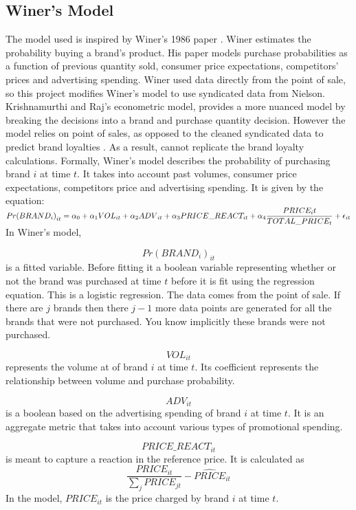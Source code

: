 \documentclass{article}
\begin{document}
\subsection{Winer's Model}

The model used is inspired by Winer's 1986 paper \cite{winer}. Winer estimates the probability buying a brand's product. His paper models purchase probabilities as a function of previous quantity sold, consumer price expectations, competitors' prices and advertising spending. Winer used data directly from the point of sale, so this project modifies Winer's model to use syndicated data from Nielson. Krishnamurthi and Raj's econometric model, provides a more nuanced model by breaking the decisions into a brand and purchase quantity decision. However the model relies on point of sales, as opposed to the cleaned syndicated data to predict brand loyalties . As a result, cannot replicate the brand loyalty calculations. Formally, Winer's model describes the probability of purchasing brand $i$ at time $t$. It takes into account past volumes, consumer price expectations, competitors price and advertising spending. It is given by the equation: \\

$ {Pr(BRAND_i)}_{it} = \alpha_0 + \alpha_1 {VOL}_{it} + \alpha_2 {ADV}_{it} +  \alpha_3 PRICE\_REACT_{it}  \medskip + \alpha_4 \dfrac{PRICE_it}{TOTAL\_PRICE_{t}} + \epsilon_{it}$\\

In Winer's model,

$${Pr(BRAND_i)}_{it} $$ is a fitted variable. Before fitting it a boolean variable representing whether or not the brand was purchased at time $t$ before it is fit using the regression equation. This is a logistic regression. The data comes from the point of sale. If there are $j$ brands then there $j-1$ more data points are generated for all the brands that were not purchased. You know implicitly these brands were not purchased.

$$VOL_{it}$$ represents the volume at of brand $i$ at time $t$. Its coefficient represents the relationship between volume and purchase probability.

$$ADV_{it}$$ is a boolean based on the advertising spending of brand $i$ at time $t$. It is an aggregate metric that takes into account various types of promotional spending.

$$PRICE\_REACT_{it}$$ is meant to capture a reaction in the reference price. It is calculated as $$\dfrac{PRICE_{it}} {\sum_j PRICE_{jt}} - \widehat{PRICE}_{it}$$ In the model, ${PRICE}_{it}$ is the price charged by brand $i$ at time $t$. 
\end{document}
